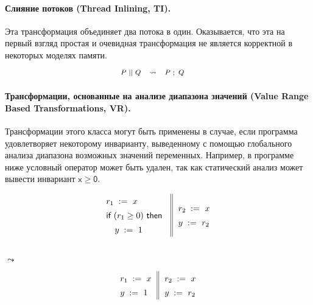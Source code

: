 \paragraph{Слияние потоков (Thread Inlining, TI).}

Эта трансформация объединяет два потока в один.
Оказывается, что эта на первый взгляд простая и очевидная
трансформация не является корректной в некоторых моделях памяти. 
%
\[\def\arraystretch{1.4}\footnotesize
  \begin{array}{cccl} 

      P \pll Q 
    & \leadsto 
    & P ~\seq Q
    & ~ \\ 
    
  \end{array}
\]


\paragraph{
Трансформации, основанные на анализе диапазона значений
(Value Range Based Transformations, VR).
}

Трансформации этого класса могут быть применены в случае,
если программа удовлетворяет некоторому инварианту,
выведенному с помощью глобального анализа 
диапазона возможных значений переменных.
Например, в программе ниже условный оператор
может быть удален, так как статический 
анализ может вывести инвариант 
$\mathsf{x} \geq \mathsf{0}$.

{\footnotesize
\begin{minipage}{0.45\linewidth}
\begin{equation*}
\inarrII{
   \readInst{}{r_1}{x}             \\
   \kw{if} (r_1 \geq 0) ~\kw{then} \\
   \quad\writeInst{}{y}{1}         \\
}{
  \readInst{}{r_2}{x}               \\
  \writeInst{}{y}{r_2}              \\
}
\end{equation*}
\end{minipage}\hfill%
\begin{minipage}{0.05\linewidth}
\Large~\\ $\leadsto$
\end{minipage}\hfill%
\begin{minipage}{0.4\linewidth}
\begin{equation*}
\inarrII{
   \readInst{}{r_1}{x}             \\
   \writeInst{}{y}{1}              \\
}{
  \readInst{}{r_2}{x}               \\
  \writeInst{}{y}{r_2}              \\
}
\end{equation*}
\end{minipage}
}

